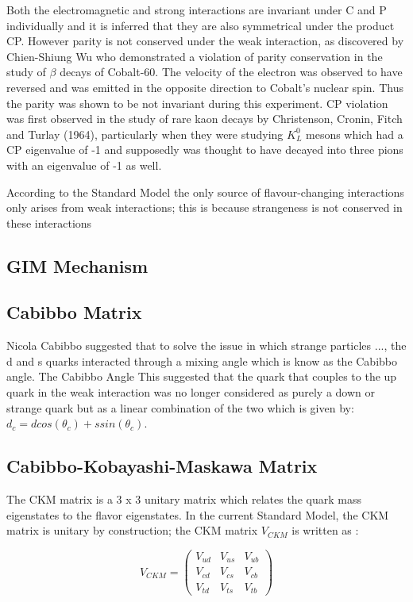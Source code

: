 \documentclass[12pt,a4paper]{article}
\begin{document}
Both the electromagnetic and strong interactions are invariant under C and P individually and it is inferred that they are also symmetrical under the product CP. However parity is not conserved under the weak interaction, as discovered by Chien-Shiung Wu who demonstrated a violation of parity conservation in the study of $\beta$ decays of Cobalt-60. The velocity of the electron was observed to have reversed and was emitted in the opposite direction to Cobalt's nuclear spin. Thus the parity was shown to be not invariant during this experiment. 
CP violation was first observed in the study of rare kaon decays by Christenson, Cronin, Fitch and Turlay (1964), particularly when they were studying $K^0_L$ mesons which had a CP eigenvalue of -1 and supposedly was thought to have decayed into three pions with an eigenvalue of -1 as well. 

According to the Standard Model the only source of flavour-changing interactions only arises from weak interactions; this is because strangeness is not conserved in these interactions
			
\subsection{GIM Mechanism}


\subsection{Cabibbo Matrix}
Nicola Cabibbo suggested that to solve the issue in which strange particles ..., the d and s quarks interacted through a mixing angle which is know as the Cabibbo angle. The Cabibbo Angle  This suggested that the quark that couples to the up quark in the weak interaction was no longer considered as purely a down or strange quark but as a linear combination of the two which is given by:
$d_c = dcos(\theta_c) + ssin(\theta_c)$.

\subsection{Cabibbo-Kobayashi-Maskawa Matrix}
The CKM matrix is a 3 x 3 unitary matrix which relates the quark mass eigenstates to the flavor eigenstates. In the current Standard Model, the CKM matrix is unitary by construction; the CKM matrix $ V _{CKM} $ is written as : \par
\[ V_{CKM} =  
 \left(
 \begin{array}{ccc}
  V_{ud} & V_{us} & V_{ub} \\
  V_{cd} & V_{cs} & V_{cb} \\
  V_{td} & V_{ts} & V_{tb}
 \end{array}
 \right)
\]
\end{document}
